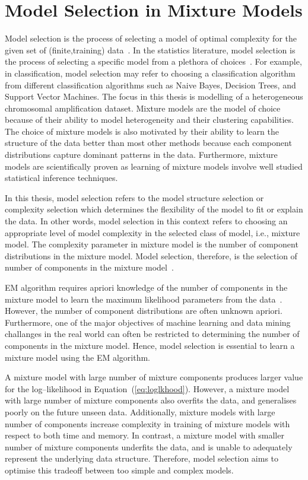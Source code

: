 \section{Model Selection in Mixture Models }
\label{s:mdlselectmix}

Model selection is the process of selecting a model of optimal complexity 
for the given set of (finite,training) data~\cite{cherkassky1998,hastie09}.
In the statistics literature, model selection is  the process of selecting 
a specific model from a plethora of choices~\cite{kadane04}. For example, 
in classification, model selection may refer to choosing a classification
algorithm from different classification algorithms such as Naive Bayes, 
Decision Trees, and Support Vector Machines. The focus in this thesis is 
modelling of a heterogeneous chromosomal amplification dataset.  
Mixture models are the model of choice because of their ability to model 
heterogeneity and their clustering capabilities. The choice of mixture
models is also motivated by their ability to learn the 
structure of the data better than most other methods because each 
component distributions capture dominant patterns in the data. Furthermore,
mixture models are scientifically proven as learning of mixture models 
involve well studied statistical inference techniques.

In this thesis, model 
selection refers to the model structure selection or complexity 
selection which determines the flexibility of the model to fit or 
explain the data. In other words, model selection in this context 
refers to choosing an appropriate level of model complexity in the 
selected class of model, i.e., mixture model. The complexity parameter 
in mixture  model is the number of component distributions in 
the mixture model. Model selection, therefore, is the selection 
of number of components in the mixture model~\cite{fraley1998}.

EM algorithm requires apriori knowledge of the number of components  
in the mixture model to learn the maximum likelihood parameters from
the data~\cite{McLachlan2008emext}. However, the number of component
distributions are often unknown apriori. Furthermore, one of the major
objectives of machine learning and data mining challanges in the real 
world can often be restricted to determining the number of components 
in the mixture model. Hence, model selection is essential to learn a 
mixture model using the EM algorithm.

A mixture model with large number of mixture components produces larger 
value for the log--likelihood in Equation~(\ref{eq:loglkhood}). However,
a mixture model with large number of mixture components also overfits 
the data, and generalises poorly on the future unseen data. Additionally, 
mixture models with large number of components increase complexity 
in training of mixture models with respect to both time and  memory.
In contrast, a mixture model with smaller number of mixture components 
underfits the data, and is unable to adequately represent 
the underlying data structure. Therefore, model selection aims to 
optimise this tradeoff between too simple and complex models.


